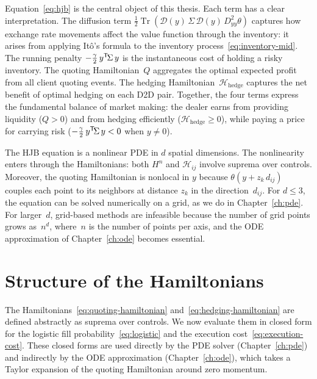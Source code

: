Equation~\eqref{eq:hjb} is the central object of this thesis. Each term has a clear interpretation. The diffusion term $\frac{1}{2}\operatorname{Tr}(\mathcal{D}(y)\,\Sigma\,\mathcal{D}(y)\,D^2_{yy}\theta)$ captures how exchange rate movements affect the value function through the inventory: it arises from applying It\^{o}'s formula to the inventory process~\eqref{eq:inventory-mid}. The running penalty $-\frac{\gamma}{2}\,y^{\mathsf{T}}\!\Sigma\,y$ is the instantaneous cost of holding a risky inventory. The quoting Hamiltonian~$Q$ aggregates the optimal expected profit from all client quoting events. The hedging Hamiltonian~$\mathcal{H}_{\text{hedge}}$ captures the net benefit of optimal hedging on each D2D pair. Together, the four terms express the fundamental balance of market making: the dealer earns from providing liquidity ($Q > 0$) and from hedging efficiently ($\mathcal{H}_{\text{hedge}} \geq 0$), while paying a price for carrying risk ($-\frac{\gamma}{2}\,y^{\mathsf{T}}\!\Sigma\,y < 0$ when $y \neq 0$).

The HJB equation is a nonlinear PDE in $d$ spatial dimensions. The nonlinearity enters through the Hamiltonians: both $H^n$ and $\mathcal{H}_{ij}$ involve suprema over controls. Moreover, the quoting Hamiltonian is nonlocal in $y$ because $\theta(y + z_k\,d_{ij})$ couples each point to its neighbors at distance $z_k$ in the direction~$d_{ij}$. For $d \leq 3$, the equation can be solved numerically on a grid, as we do in Chapter~\ref{ch:pde}. For larger~$d$, grid-based methods are infeasible because the number of grid points grows as~$n^d$, where~$n$ is the number of points per axis, and the ODE approximation of Chapter~\ref{ch:ode} becomes essential.


\section{Structure of the Hamiltonians}
\label{sec:model-hamiltonians}

The Hamiltonians~\eqref{eq:quoting-hamiltonian} and~\eqref{eq:hedging-hamiltonian} are defined abstractly as suprema over controls. We now evaluate them in closed form for the logistic fill probability~\eqref{eq:logistic} and the execution cost~\eqref{eq:execution-cost}. These closed forms are used directly by the PDE solver (Chapter~\ref{ch:pde}) and indirectly by the ODE approximation (Chapter~\ref{ch:ode}), which takes a Taylor expansion of the quoting Hamiltonian around zero momentum.


